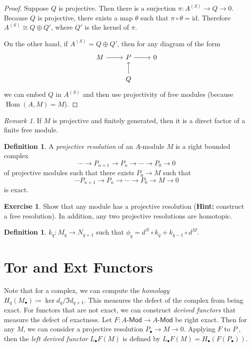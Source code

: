 \documentclass[leqno, openany]{memoir}
\theoremstyle{definition}
\newtheorem{defn}[thm]{Definition}
\newtheorem{exer}[thm]{Exercise}
\theoremstyle{remark}
\newtheorem{rmk}[thm]{Remark}
\theoremstyle{plain}
\theoremstyle{definition}
\theoremstyle{remark}
\newcommand{\mr}[1]{\mathrm{#1}}
\newcommand{\ms}[1]{\mathsf{#1}}
\DeclareMathOperator{\Hom}{Hom}
\begin{document}
\begin{proof}
    Suppose $Q$ is projective. Then there is a surjection $\pi: A^{(S)} \to Q \to 0$. Because $Q$ is projective, there exists a map $\theta$ such that $\pi \circ \theta = \mr{id}$. Therefore $A^{(S)} \cong Q  \oplus Q'$, where $Q'$ is the kernel of $\pi$.

    On the other hand, if $A^{(S)} = Q \oplus Q'$, then for any diagram of the form
    \begin{equation}
    \begin{tikzcd}
        M \arrow{r} & P \arrow{r} & 0 \\
                    & Q \arrow{u}
    \end{tikzcd}
    \end{equation}
    we can embed $Q$ in $A^{(S)}$ and then use projectivity of free modules (because $\Hom(A,M) = M$).
\end{proof}

\begin{rmk}
    If $M$ is projective and finitely generated, then it is a direct factor of a finite free module.
\end{rmk}

\begin{defn}
    A \textit{projective resolution} of an $A$-module $M$ is a right bounded complex
    \[ \cdots \to P_{n+1} \to P_n \to \cdots \to P_0 \to 0 \]
    of projective modules such that there exists $P_0 \to M$ such that
    \[ \cdots P_{n+1} \to P_n \to \cdots \to P_0 \to M \to 0 \]
    is exact.
\end{defn}

\begin{exer}
    Show that any module has a projective resolution (\textbf{Hint:}  construct a free resolution). In addition, any two projective resolutions are homotopic.
\end{exer}

\begin{defn}
    $k_q: M_q \to N_{q+1}$ such that 
    $\phi_q = d^N \circ k_q + k_{q-1} \circ d^M$. 
\end{defn}

\section{Tor and Ext Functors}%
\label{sec:derived_functors}

Note that for a complex, we can compute the \textit{homology} 
$H_q(M_{\bullet}) \coloneqq \ker d_q / \Im d_{q+1}$. 
This measures the defect of the complex from being exact. 
For functors that are not exact, we can construct \textit{derived functors} that measure the defect of exactness. 
Let $F: A\text{-}\ms{Mod} \to A\text{-}\ms{Mod}$ be right exact. 
Then for any $M$, we can consider a projective resolution 
$P_{\bullet} \to M \to 0$. 
Applying $F$ to $P_{.}$, then the \textit{left derived functor} 
$L_{\bullet} F(M)$ is defined by $L_{\bullet} F(M) = H_{\bullet}(F(P_{\bullet}))$.
\end{document}
